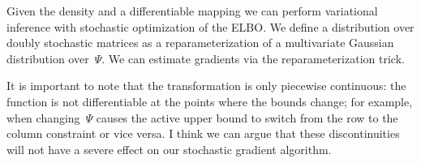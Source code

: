 \documentclass[twoside]{article}
\begin{document}
Given the density and a differentiable mapping we can perform
variational inference with stochastic optimization of the ELBO.
We define a distribution over doubly stochastic matrices as a
reparameterization of a multivariate Gaussian distribution
over~$\Psi$. We can estimate gradients via the reparameterization
trick.

It is important to note that the transformation is only piecewise
continuous: the function is not differentiable at the points where
the bounds change; for example, when changing~$\Psi$ causes the
active upper bound to switch from the row to the column constraint
or vice versa.  I think we can argue that these discontinuities
will not have a severe effect on our stochastic gradient algorithm.
\end{document}
